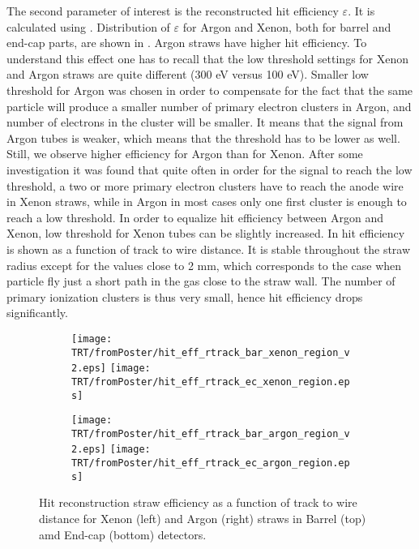 The second parameter of interest is the reconstructed hit efficiency $\varepsilon$. It is calculated using .
Distribution of $\varepsilon$ for Argon and Xenon, both for barrel and end-cap parts, are shown in .
Argon straws have higher hit efficiency. To understand this effect one has to recall that the low threshold settings
for Xenon and Argon straws are quite different (300 eV versus 100 eV). Smaller low threshold for Argon was chosen 
in order to compensate for the fact that the same particle will produce a smaller number of primary electron clusters in Argon, 
and number of electrons in the cluster will be smaller. It means that the signal from Argon tubes is weaker, which means
that the threshold has to be lower as well. Still, we observe higher efficiency for Argon than for Xenon. After some investigation
it was found that quite often in order for the signal to reach the low threshold, a two or more primary electron clusters have to reach the anode wire in
Xenon straws, while in Argon in most cases only one first cluster is enough to reach a low threshold.
In order to equalize hit efficiency between Argon and Xenon, low threshold for Xenon tubes can be slightly increased.
In  hit efficiency is shown as a function of track to wire distance. 
It is stable throughout the straw radius except for the values close to 2 mm, which corresponds
to the case when particle fly just a short path in the gas close to the straw wall. 
The number of primary ionization clusters is thus very small, hence hit efficiency drops significantly.

\begin{figure}

\begin{subfigure}{.5\textwidth}
  \centering
  \texttt{[image: TRT/fromPoster/hit\_eff\_rtrack\_bar\_xenon\_region\_v2.eps]}
  \texttt{[image: TRT/fromPoster/hit\_eff\_rtrack\_ec\_xenon\_region.eps]}
\end{subfigure}%
\begin{subfigure}{.5\textwidth}
  \centering
  \texttt{[image: TRT/fromPoster/hit\_eff\_rtrack\_bar\_argon\_region\_v2.eps]}
  \texttt{[image: TRT/fromPoster/hit\_eff\_rtrack\_ec\_argon\_region.eps]}
\end{subfigure}

\caption{Hit reconstruction straw efficiency as a function of track to wire distance 
for Xenon (left) and Argon (right) straws in Barrel (top) amd End-cap (bottom) detectors.}
  \label{fig:hit_eff_rtrack_bar}
\end{figure}


